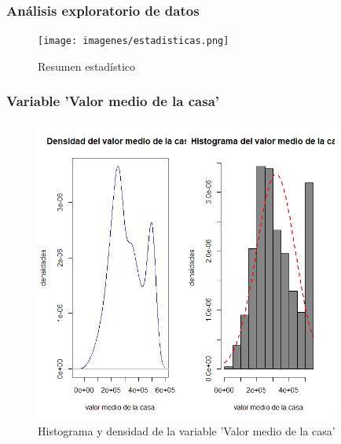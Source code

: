 \documentclass[12pt]{beamer}
\begin{document}
\begin{frame}
\frametitle{Análisis exploratorio de datos}
\begin{figure}[!h]
    \begin{center}
        \texttt{[image: imagenes/estadisticas.png]}
        \caption{Resumen estadístico}
        \label{fig:Densidad}
    \end{center}
\end{figure}

\end{frame}
\begin{frame}
\frametitle{Variable 'Valor medio de la casa'}
\begin{figure}[!h]
    \begin{center}
        \includegraphics[width=10cm]{imagenes/1.png}
        \caption{Histograma y densidad de la variable 'Valor medio de la casa'}
        \label{fig:Densidad}
    \end{center}
\end{figure}
\end{frame}
\end{document}
